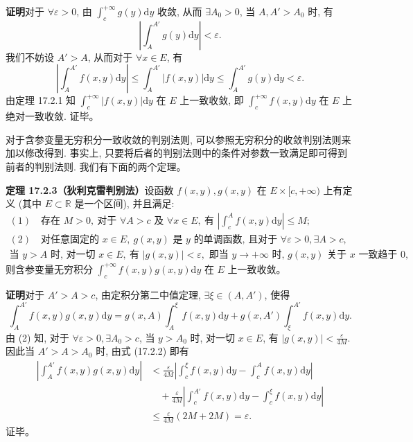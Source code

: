 \documentclass[UTF8, 12pt, fontset=fandol, oneside]{ctexart}
\begin{document}
\noindent\textbf{证明}\quad 对于 $\forall\varepsilon>0$, 由 $\int_c^{+\infty}g(y)\mathrm dy$ 收敛, 从而 $\exists A_0>0$, 当 $A,A'>A_0$ 时, 有
\[
  \left|\int_A^{A'}g(y)\mathrm dy\right|<\varepsilon.
\]
我们不妨设 $A'>A$, 从而对于 $\forall x\in E$, 有
\[
  \left|\int_A^{A'}f(x,y)\mathrm dy\right|
  \leqslant\int_A^{A'}|f(x,y)|\mathrm dy
  \leqslant\int_A^{A'}g(y)\mathrm dy<\varepsilon.
\]
由定理 17.2.1 知 $\int_c^{+\infty}|f(x,y)|\mathrm dy$ 在 $E$ 上一致收敛, 即 $\int_c^{+\infty}f(x,y)\mathrm dy$ 在 $E$ 上绝对一致收敛. 证毕。

对于含参变量无穷积分一致收敛的判别法则, 可以参照无穷积分的收敛判别法则来加以修改得到. 事实上, 只要将后者的判别法则中的条件对参数一致满足即可得到前者的判别法则. 我们有下面的两个定理。

\noindent\textbf{定理 17.2.3（狄利克雷判别法）}\quad 设函数 $f(x,y),g(x,y)$ 在 $E\times[c,+\infty)$ 上有定义 (其中 $E\subset\mathbb R$ 是一个区间), 并且满足:
\[
\begin{gathered}
  (1)\quad \text{存在 } M>0,\ \text{对于 } \forall A>c \text{ 及 } \forall x\in E,\ \text{有 }
  \left|\int_c^A f(x,y)\mathrm dy\right|\leqslant M;\\
  (2)\quad \text{对任意固定的 } x\in E,\ g(x,y) \text{ 是 } y \text{ 的单调函数, 且对于 } \forall\varepsilon>0,\exists A>c,\\
  \text{当 } y>A \text{ 时, 对一切 } x\in E,\ \text{有 } |g(x,y)|<\varepsilon,
  \text{ 即当 } y\to+\infty \text{ 时, } g(x,y) \text{ 关于 } x \text{ 一致趋于 } 0,
\end{gathered}
\]
则含参变量无穷积分 $\int_c^{+\infty}f(x,y)g(x,y)\mathrm dy$ 在 $E$ 上一致收敛。

\noindent\textbf{证明}\quad 对于 $A'>A>c$, 由定积分第二中值定理, $\exists\xi\in(A,A')$, 使得
\[
  \int_A^{A'}f(x,y)g(x,y)\mathrm dy
  =
  g(x,A)\int_A^\xi f(x,y)\mathrm dy
  +g(x,A')\int_\xi^{A'}f(x,y)\mathrm dy.
  \tag{17.2.2}
\]
由 (2) 知, 对于 $\forall\varepsilon>0,\exists A_0>c$, 当 $y>A_0$ 时, 对一切 $x\in E$, 有 $|g(x,y)|<\frac{\varepsilon}{4M}$. 因此当 $A'>A>A_0$ 时, 由式 (17.2.2) 即有
\[
\begin{aligned}
  \left|\int_A^{A'}f(x,y)g(x,y)\mathrm dy\right|
  &<\frac{\varepsilon}{4M}\left|\int_c^\xi f(x,y)\mathrm dy-\int_c^A f(x,y)\mathrm dy\right|\\
  &\quad+\frac{\varepsilon}{4M}\left|\int_c^{A'}f(x,y)\mathrm dy-\int_c^\xi f(x,y)\mathrm dy\right|\\
  &\leqslant\frac{\varepsilon}{4M}(2M+2M)=\varepsilon.
\end{aligned}
\]
证毕。
\end{document}
